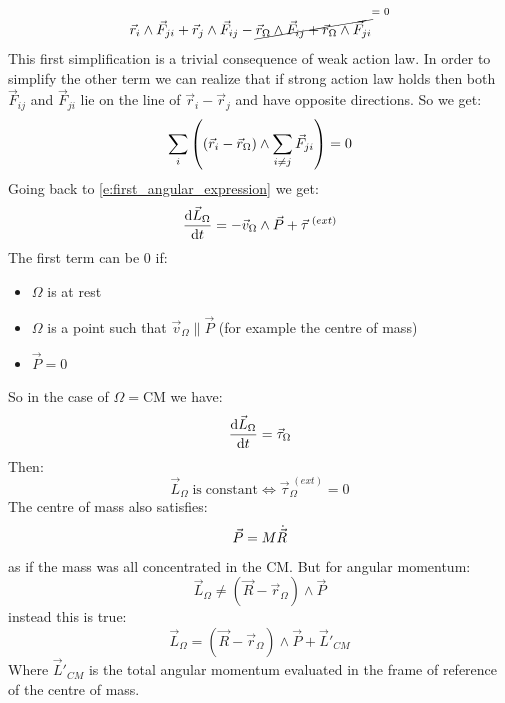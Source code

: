 \begin{equation}
    \vec{r}_i\wedge\vec{F}_{ji} + \vec{r}_j\wedge\vec{F}_{ij}-\crossout{{\vec{r}_{\Omega}\wedge\vec{F}_{ij}+\vec{r}_{\Omega}\wedge\vec{F}_{ji}}}
\end{equation}
This first simplification is a trivial consequence of weak action law. In order to simplify the other term we can realize that if strong action law holds then both $\vec{F}_{ij}$ and $\vec{F}_{ji}$ lie on the line of $\vec{r}_i-\vec{r}_j$ and have opposite directions.
So we get:
\begin{equation}
    \displaystyle\sum_{i}\left(\left(\vec{r}_i-\vec{r}_{\Omega}\right)\wedge\displaystyle\sum_{i\neq j}\vec{F}_{ji}\right) = 0
\end{equation}
Going back to \eqref{e:first_angular_expression} we get:
\begin{equation}
    \dfrac{\mathrm{d}\vec{L}_{\Omega}}{\mathrm{d}t} = -\vec{v}_{\Omega}\wedge\vec{P} + \vec{\tau}^{\;(ext)}
\end{equation}
The first term can be 0 if:
\begin{itemize}
    \item $\Omega$ is at rest
    \item $\Omega$ is a point such that $\vec{v}_{\Omega} \parallel \vec{P}$ (for example the centre of mass)
    \item $\vec{P}=0$
\end{itemize}
So in the case of $\Omega = \mathrm{CM}$ we have:
\begin{equation} \label{e:first_cardinal}
    \dfrac{\mathrm{d}\vec{L}_{\Omega}}{\mathrm{d}t} = \vec{\tau}_{\Omega}
\end{equation}
Then:
\begin{equation}
    \vec{L}_{\Omega}\;\mathrm{is\;constant} \iff \vec{\tau}_{\Omega}^{\;(ext)}=0
\end{equation}
The centre of mass also satisfies:
\begin{equation}
    \vec{P} = M\dot{\vec{R}}
\end{equation}
as if the mass was all concentrated in the CM. But for angular momentum:
\begin{equation}
    \vec{L}_{\Omega} \neq (\vec{R}-\vec{r}_{\Omega})\wedge\vec{P}
\end{equation}
instead this is true:
\begin{equation}
    \vec{L}_{\Omega} = (\vec{R}-\vec{r}_{\Omega})\wedge\vec{P} + \vec{L}'_{CM}
\end{equation}
Where $\vec{L}'_{CM}$ is the total angular momentum evaluated in the frame of reference of the centre of mass.\\
